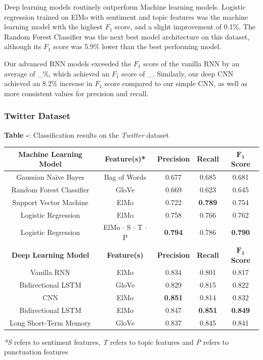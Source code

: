 \documentclass[12pt,a4paper]{article}
\begin{document}
\noindent Deep learning models routinely outperform Machine learning models.
Logistic regression trained on ElMo with sentiment and topic features was the machine learning model with the highest $F_1$ score, and a slight improvement of 0.1\%. The Random Forest Classifier was the next best model architecture on this dataset, although its $F_1$ score was 5.9\% lower than the best performing model. 

Our advanced RNN models exceeded the $F_1$ score of the vanilla RNN by an average of \_\%, which achieved an $F_1$ score of \_. Similarly, our deep CNN achieved an 8.2\% increase in $F_1$ score compared to our simple CNN, as well as more consistent values for precision and recall.

\subsubsection{Twitter Dataset}

\begin{center}
	\textbf{Table -}: Classification results on the \textit{Twitter} dataset
\end{center}

\begin{center}
	\begin{tabular}{ |c||c|c|c|c|}
		\hline
		\textbf{Machine Learning Model}& \textbf{Feature(s)*} & \textbf{Precision} & \textbf{Recall} & \textbf{$\mathbf{F_1}$ Score}\\
		\hline\hline
		Gaussian Na\"{i}ve Bayes & Bag of Words & 0.677 & 0.685 & 0.681\\
		Random Forest Classifier & GloVe  & 0.669   & 0.623 & 0.645\\
		Support Vector Machine & ElMo  & 0.722 & \textbf{0.789} & 0.754\\
		Logistic Regression & ElMo  & 0.758 & 0.766 & 0.762\\
		Logistic Regression & ElMo $\cdot$ S $\cdot$ T $\cdot$ P & \textbf{0.794} & 0.786 & \textbf{0.790}\\
		\hline\hline
		\textbf{Deep Learning Model}& \textbf{Feature(s)} & \textbf{Precision} & \textbf{Recall} & \textbf{$\mathbf{F_1}$ Score}\\
		\hline
		Vanilla RNN & ElMo  & 0.834   & 0.801 & 0.817\\
		Bidirectional LSTM & GloVe  & 0.829 & 0.815 & 0.822\\
		CNN & ElMo  & \textbf{0.851}   & 0.814 & 0.832\\
		Bidirectional LSTM & ElMo  & 0.847   & \textbf{0.851} & \textbf{0.849}\\
		Long Short-Term Memory & GloVe & 0.837   & 0.845 & 0.841\\
		\hline
	\end{tabular}
\end{center}
\textit{*S} refers to sentiment features, \textit{T} refers to topic features and \textit{P} refers to punctuation features\\
\end{document}
